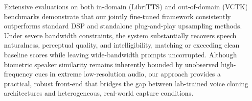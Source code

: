 \documentclass{article}
\begin{document}
Extensive evaluations on both in-domain (LibriTTS) and out-of-domain (VCTK) benchmarks demonstrate that our jointly fine-tuned framework consistently outperforms standard DSP and standalone plug-and-play upsampling methods. Under severe bandwidth constraints, the system substantially recovers speech naturalness, perceptual quality, and intelligibility, matching or exceeding clean baseline scores while leaving wide-bandwidth prompts uncorrupted. Although biometric speaker similarity remains inherently bounded by unobserved high-frequency cues in extreme low-resolution audio, our approach provides a practical, robust front-end that bridges the gap between lab-trained voice cloning architectures and heterogeneous, real-world capture conditions.
\vfill\pagebreak




\end{document}
